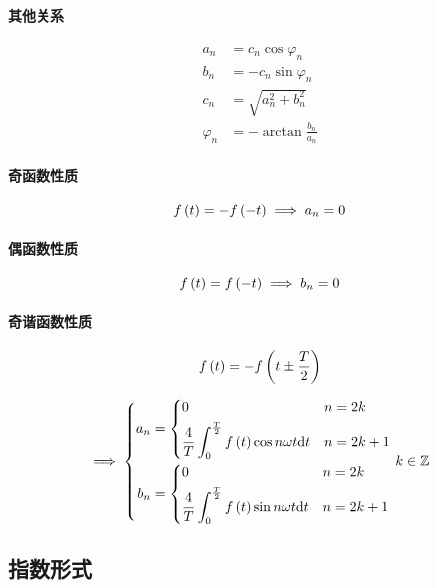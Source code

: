 \documentclass{article}
\begin{document}
\paragraph{其他关系}

\[\begin{aligned}
        a_n       & =c_n\cos\varphi_n        \\
        b_n       & =-c_n\sin\varphi_n       \\
        c_n       & =\sqrt{a_n^2+b_n^2}      \\
        \varphi_n & =-\arctan\frac{b_n}{a_n}
    \end{aligned}\]

\paragraph{奇函数性质}\[f\left(t\right)=-f\left(-t\right)\implies a_n=0\]

\paragraph{偶函数性质}\[f\left(t\right)=f\left(-t\right)\implies b_n=0\]

\paragraph{奇谐函数性质}\[f\left(t\right)=-f\left(t\pm\frac T2\right)\]

\[\implies\left\{\begin{aligned}
        a_n & =
        \left\{\begin{aligned}
                    & 0                                             &  & n=2k   \\
                    & \frac4T\int_0^{\frac T2}f\left(t\right)\cos n\omega t\mathrm d t &  & n=2k+1
               \end{aligned}\right. \\
        b_n & =
        \left\{\begin{aligned}
                    & 0                                             &  & n=2k   \\
                    & \frac4T\int_0^{\frac T2}f\left(t\right)\sin n\omega t\mathrm d t &  & n=2k+1
               \end{aligned}\right.
    \end{aligned}\right.k\in\mathbb Z\]

\subsection{指数形式}
\end{document}
